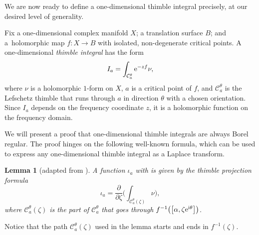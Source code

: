 \documentclass[pdftex]{sigma}
\newcommand{\maps}{\colon}
\newcommand{\laplace}{\mathcal{L}}
\numberwithin{equation}{section}
\newtheorem{Lemma}[Theorem]{Lemma}
\begin{document}
We are now ready to define a one-dimensional thimble integral precisely, at our desired level of generality.
\begin{Definition}
Fix a one-dimensional complex manifold $X$; a translation surface $B$; and a~holomorphic map $f \maps X \to B$ with isolated, non-degenerate critical points. A one-dimensional {\em thimble integral} has the form
\[
 I_a = \int_{\mathcal{C}_a^\theta} {\rm e}^{-zf} \nu,
 \]
where $\nu$ is a holomorphic $1$-form on $X$, $a$ is a critical point of $f$, and $\mathcal{C}^\theta_a$ is the Lefschetz thimble that runs through $a$ in direction $\theta$ with a chosen orientation. Since $I_a$ depends on the frequency coordinate $z$, it is a holomorphic function on the frequency domain.
\end{Definition}
We will present a proof that one-dimensional thimble integrals are always Borel regular. The proof hinges on the following well-known formula, which can be used to express any one-dimensional thimble integral as a Laplace transform.
\begin{Lemma}[adapted from {\cite[Section~3.3]{pham}}]\label{lem:thimble_proj_formula}
A function $\iota_a$ with \smash{$I_a = \laplace_{\zeta, \alpha}^\theta \iota_a$} is given by the {\em thimble projection formula}
\[
 \iota_a = \frac{\partial}{\partial \zeta} \biggl( \int_{\mathcal{C}_a^\theta(\zeta)}\nu \biggr),
 \]
where $\mathcal{C}_a^\theta(\zeta)$ is the part of $\mathcal{C}_a^\theta$ that goes through $f^{-1}\bigl(\bigl[\alpha,\zeta {\rm e}^{{\rm i}\theta}\bigr]\bigr)$.
\end{Lemma}
Notice that the path $\mathcal{C}_a^\theta(\zeta)$ used in the lemma starts and ends in $f^{-1}(\zeta)$.
\end{document}
